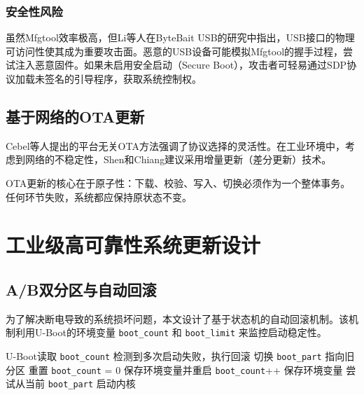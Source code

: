 \documentclass[a4paper,12pt]{article}
\begin{document}
\subsubsection{安全性风险}
虽然Mfgtool效率极高，但Li等人在ByteBait USB的研究中指出，USB接口的物理可访问性使其成为重要攻击面\cite{Li2025}。恶意的USB设备可能模拟Mfgtool的握手过程，尝试注入恶意固件。如果未启用安全启动（Secure Boot），攻击者可轻易通过SDP协议加载未签名的引导程序，获取系统控制权。

\subsection{基于网络的OTA更新}
Cebel等人提出的平台无关OTA方法强调了协议选择的灵活性\cite{Cebel2022}。在工业环境中，考虑到网络的不稳定性，Shen和Chiang建议采用增量更新（差分更新）技术\cite{Shen2007}。

OTA更新的核心在于原子性：下载、校验、写入、切换必须作为一个整体事务。任何环节失败，系统都应保持原状态不变。

\newpage
\section{工业级高可靠性系统更新设计}

\subsection{A/B双分区与自动回滚}
为了解决断电导致的系统损坏问题，本文设计了基于状态机的自动回滚机制。该机制利用U-Boot的环境变量 \texttt{boot\_count} 和 \texttt{boot\_limit} 来监控启动稳定性。

\begin{algorithm}[H]
\caption{双分区自动回滚逻辑}
\begin{algorithmic}[1]
\STATE U-Boot读取 \texttt{boot\_count}
    \STATE 检测到多次启动失败，执行回滚
    \STATE 切换 \texttt{boot\_part} 指向旧分区
    \STATE 重置 \texttt{boot\_count} = 0
    \STATE 保存环境变量并重启
\ELSE
    \STATE \texttt{boot\_count}++
    \STATE 保存环境变量
    \STATE 尝试从当前 \texttt{boot\_part} 启动内核
\ENDIF
\end{algorithmic}
\end{algorithm}
\end{document}
